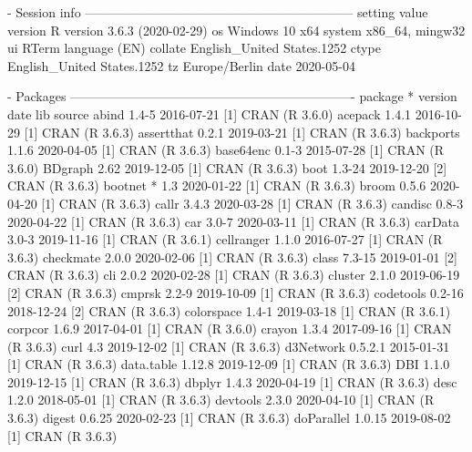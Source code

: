 \documentclass[a4paper,12pt]{article} %
\begin{document}
\begin{Schunk}
\begin{Soutput}
- Session info ---------------------------------------------------------------
 setting  value                       
 version  R version 3.6.3 (2020-02-29)
 os       Windows 10 x64              
 system   x86_64, mingw32             
 ui       RTerm                       
 language (EN)                        
 collate  English_United States.1252  
 ctype    English_United States.1252  
 tz       Europe/Berlin               
 date     2020-05-04                  

- Packages -------------------------------------------------------------------
 package        * version    date       lib source        
 abind            1.4-5      2016-07-21 [1] CRAN (R 3.6.0)
 acepack          1.4.1      2016-10-29 [1] CRAN (R 3.6.3)
 assertthat       0.2.1      2019-03-21 [1] CRAN (R 3.6.3)
 backports        1.1.6      2020-04-05 [1] CRAN (R 3.6.3)
 base64enc        0.1-3      2015-07-28 [1] CRAN (R 3.6.0)
 BDgraph          2.62       2019-12-05 [1] CRAN (R 3.6.3)
 boot             1.3-24     2019-12-20 [2] CRAN (R 3.6.3)
 bootnet        * 1.3        2020-01-22 [1] CRAN (R 3.6.3)
 broom            0.5.6      2020-04-20 [1] CRAN (R 3.6.3)
 callr            3.4.3      2020-03-28 [1] CRAN (R 3.6.3)
 candisc          0.8-3      2020-04-22 [1] CRAN (R 3.6.3)
 car              3.0-7      2020-03-11 [1] CRAN (R 3.6.3)
 carData          3.0-3      2019-11-16 [1] CRAN (R 3.6.1)
 cellranger       1.1.0      2016-07-27 [1] CRAN (R 3.6.3)
 checkmate        2.0.0      2020-02-06 [1] CRAN (R 3.6.3)
 class            7.3-15     2019-01-01 [2] CRAN (R 3.6.3)
 cli              2.0.2      2020-02-28 [1] CRAN (R 3.6.3)
 cluster          2.1.0      2019-06-19 [2] CRAN (R 3.6.3)
 cmprsk           2.2-9      2019-10-09 [1] CRAN (R 3.6.3)
 codetools        0.2-16     2018-12-24 [2] CRAN (R 3.6.3)
 colorspace       1.4-1      2019-03-18 [1] CRAN (R 3.6.1)
 corpcor          1.6.9      2017-04-01 [1] CRAN (R 3.6.0)
 crayon           1.3.4      2017-09-16 [1] CRAN (R 3.6.3)
 curl             4.3        2019-12-02 [1] CRAN (R 3.6.3)
 d3Network        0.5.2.1    2015-01-31 [1] CRAN (R 3.6.3)
 data.table       1.12.8     2019-12-09 [1] CRAN (R 3.6.3)
 DBI              1.1.0      2019-12-15 [1] CRAN (R 3.6.3)
 dbplyr           1.4.3      2020-04-19 [1] CRAN (R 3.6.3)
 desc             1.2.0      2018-05-01 [1] CRAN (R 3.6.3)
 devtools         2.3.0      2020-04-10 [1] CRAN (R 3.6.3)
 digest           0.6.25     2020-02-23 [1] CRAN (R 3.6.3)
 doParallel       1.0.15     2019-08-02 [1] CRAN (R 3.6.3)

\end{Soutput}
\end{Schunk}
\end{document}
